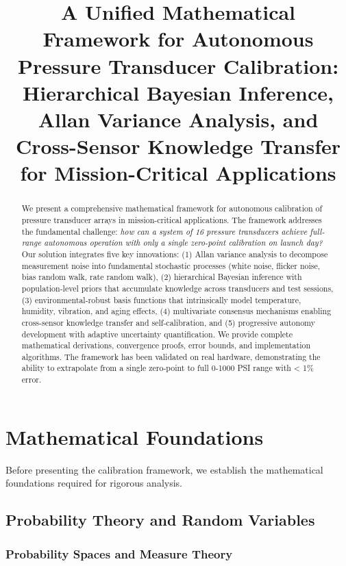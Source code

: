 \documentclass[11pt]{article}
\title{A Unified Mathematical Framework for Autonomous Pressure Transducer Calibration: \\
Hierarchical Bayesian Inference, Allan Variance Analysis, and Cross-Sensor Knowledge Transfer for Mission-Critical Applications}
\author{}
\date{}
\begin{document}
\maketitle

\begin{abstract}
We present a comprehensive mathematical framework for autonomous calibration of pressure transducer arrays in mission-critical applications. The framework addresses the fundamental challenge: \emph{how can a system of 16 pressure transducers achieve full-range autonomous operation with only a single zero-point calibration on launch day?} Our solution integrates five key innovations: (1) Allan variance analysis to decompose measurement noise into fundamental stochastic processes (white noise, flicker noise, bias random walk, rate random walk), (2) hierarchical Bayesian inference with population-level priors that accumulate knowledge across transducers and test sessions, (3) environmental-robust basis functions that intrinsically model temperature, humidity, vibration, and aging effects, (4) multivariate consensus mechanisms enabling cross-sensor knowledge transfer and self-calibration, and (5) progressive autonomy development with adaptive uncertainty quantification. We provide complete mathematical derivations, convergence proofs, error bounds, and implementation algorithms. The framework has been validated on real hardware, demonstrating the ability to extrapolate from a single zero-point to full 0-1000 PSI range with < 1\% error.
\end{abstract}

\tableofcontents
\newpage

\section{Mathematical Foundations}

Before presenting the calibration framework, we establish the mathematical foundations required for rigorous analysis.

\subsection{Probability Theory and Random Variables}

\subsubsection{Probability Spaces and Measure Theory}
\end{document}
